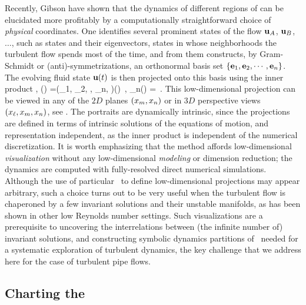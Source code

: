 Recently, Gibson \etal{} have shown that the dynamics of different regions
of {\statesp} can be elucidated more profitably by a computationally
straight\-forward choice of \emph{physical} coordinates. One identifies
several prominent states of the flow ${\bf u}_A$, ${\bf u}_B$, $\dots$, such as
{\eqv} states and their eigenvectors, states in whose neighborhoods the
turbulent flow spends most of the time, and from them constructs, by
Gram-Schmidt or (anti)-symmetrizations, an orthonormal basis set
$\{{\bf e}_1, {\bf e}_2, \cdots, {\bf e}_n\}$. The evolving fluid state ${\bf u}(t)$
is then projected onto this basis using the inner product
,
\beq
\ssp(\zeit) =(\ssp_1, \ssp_2, \cdots, \ssp_n, \cdots)(\zeit)
    \,,\qquad
\ssp_n(\zeit) = 
\,.
This low-dimensional projection can be viewed in any of the $2D$ planes
$(x_m, x_n)$ or in $3D$ perspective views $(x_{\ell},x_m,
x_n)$, see . The {\stateDsp} portraits are
{dynamically intrinsic}, since the projections are defined in terms of
intrinsic solutions of the equations of motion, and {representation
independent}, as the inner product  is independent of
the numerical discretization. It is worth emphasizing that the method
affords low-dimensional {\em visualization} without any low-dimensional
{\em modeling} or dimension reduction; the dynamics are computed with
fully-resolved direct numerical simulations. Although the use of
particular \reqva\ to define low-dimensional projections
may appear arbitrary, such a choice turns out to be
very useful when the turbulent flow is chaperoned by a few invariant
solutions and their unstable manifolds, as has been shown in other low
Reynolds number settings. Such visualizations are a
prerequisite to uncovering the interrelations between (the infinite
number of) invariant solutions, and constructing symbolic dynamics
partitions of \statesp\ needed for a systematic exploration of turbulent
dynamics, the key challenge that we address here for the case of turbulent
pipe flows.



\subsection{Charting the \slice}
\label{s:chart}

